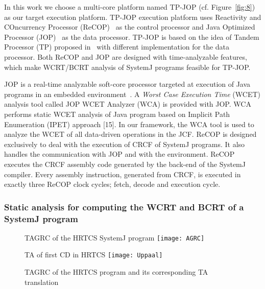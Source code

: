 In this work we choose a multi-core platform named TP-JOP
(cf. Figure~\ref{fig:8}) as our target execution platform. TP-JOP
execution platform uses Reactivity and COncurrency Processor
(ReCOP)~\cite{DBLP:journals/tecs/SalcicM13} as the control processor and
Java Optimized Processor (JOP)~\cite{jop:jnl:jsa2007} as the data
processor. TP-JOP is based on the idea of Tandem Processor (TP) proposed
in~\cite{DBLP:journals/tecs/SalcicM13} with different implementation for
the data processor. Both ReCOP and JOP are designed with time-analyzable
features, which make WCRT/BCRT analysis of SystemJ programs feasible for
TP-JOP. %

JOP is a real-time analyzable soft-core processor targeted at execution
of Java programs in an embedded environment~\cite{jop:jnl:jsa2007}. A
\textit{Worst Case Execution Time} (WCET) analysis tool called JOP WCET
Analyzer (WCA) is provided with JOP. WCA performs static WCET analysis
of Java program based on Implicit Path Enumeration (IPET) approach
[15]. In our framework, the WCA tool is used to analyze the WCET of all
data-driven operations in the JCF. ReCOP is designed exclusively to deal
with the execution of CRCF of SystemJ programs. It also handles the
communication with JOP and with the environment. ReCOP executes the CRCF
assembly code generated by the back-end of the SystemJ compiler. Every
assembly instruction, generated from CRCF, is executed in exactly three
ReCOP clock cycles; fetch, decode and execution cycle.

\subsubsection{Static analysis for computing the WCRT and BCRT of a
  SystemJ program}
\label{sec:stat-analys-comp-1}

\begin{figure*}[t!]
  \centering
  \begin{SubFloat}{\label{fig:6a} TAGRC of the HRTCS SystemJ program}
    \texttt{[image: AGRC]}
  \end{SubFloat}%
  \begin{SubFloat}{\label{fig:6b} TA of first CD in HRTCS}
    \texttt{[image: Uppaal]}
  \end{SubFloat}
  \caption{TAGRC of the HRTCS program and its corresponding TA
    translation}
  \label{fig:6}
\end{figure*}

